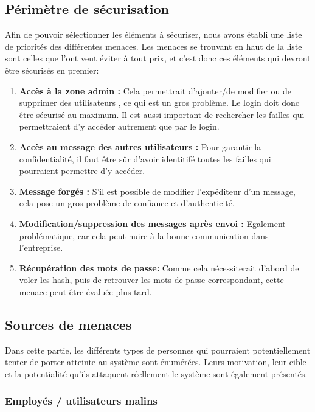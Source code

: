 \documentclass{article}
\begin{document}
\subsection{Périmètre de sécurisation}

Afin de pouvoir sélectionner les éléments à sécuriser, nous avons établi
une liste de priorités des différentes menaces. Les menaces se trouvant
en haut de la liste sont celles que l'ont veut éviter à tout prix, et
c'est donc ces éléments qui devront être sécurisés en premier:

\begin{enumerate}
\def\labelenumi{\arabic{enumi}.}

\item
  \textbf{Accès à la zone admin :} Cela permettrait d'ajouter/de
  modifier ou de supprimer des utilisateurs , ce qui est un gros
  problème. Le login doit donc être sécurisé au maximum. Il est aussi
  important de rechercher les failles qui permettraient d'y accéder
  autrement que par le login.
\item
  \textbf{Accès au message des autres utilisateurs :} Pour garantir la
  confidentialité, il faut être sûr d'avoir identitifé toutes les
  failles qui pourraient permettre d'y accéder.
\item
  \textbf{Message forgés :} S'il est possible de modifier l'expéditeur
  d'un message, cela pose un gros problème de confiance et
  d'authenticité.
\item
  \textbf{Modification/suppression des messages après envoi :} Egalement
  problématique, car cela peut nuire à la bonne communication dans
  l'entreprise.
\item
  \textbf{Récupération des mots de passe:} Comme cela nécessiterait
  d'abord de voler les hash, puis de retrouver les mots de passe
  correspondant, cette menace peut être évaluée plus tard.
\end{enumerate}

\subsection{Sources de menaces}

Dans cette partie, les différents types de personnes qui pourraient
potentiellement tenter de porter atteinte au système sont énumérées.
Leurs motivation, leur cible et la potentialité qu'ils attaquent
réellement le système sont également présentés.

\subsubsection{Employés / utilisateurs malins}
\end{document}
